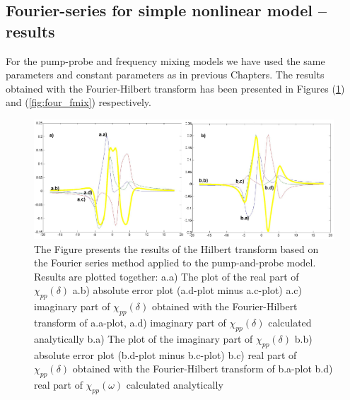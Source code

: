 \documentclass[12pt,twoside,a4paper]{article}
\numberwithin{equation}{subsection}
\numberwithin{figure}{subsection}
\begin{document}
\subsection{Fourier-series for simple nonlinear model -- results} \label{chap:fourier_nlo}

For the pump-probe and frequency mixing models we have used the same parameters and constant parameters as in previous Chapters. The results obtained with the Fourier-Hilbert transform has been presented in Figures (\ref{fig:four_pnp}) and (\ref{fig:four_fmix}) respectively.

\begin{figure} 
  \includegraphics[width=150mm]{img/four_pnp.png}
  \caption{The Figure presents the results of the Hilbert transform based on the Fourier series method applied to the pump-and-probe model. Results are plotted together:
     a.a) The plot of the real part of ${\chi_{pp}}(\delta )$
     a.b) absolute error plot (a.d-plot minus a.c-plot)
     a.c) imaginary part of ${\chi_{pp}}(\delta )$ obtained with the Fourier-Hilbert transform of a.a-plot, 
     a.d) imaginary part of ${\chi_{pp}}(\delta )$ calculated analytically 
     b.a) The plot of the imaginary part of ${\chi_{pp}}(\delta )$ 
     b.b) absolute error plot (b.d-plot minus b.c-plot)
     b.c) real part of ${\chi_{pp}}(\delta )$ obtained with the Fourier-Hilbert transform of b.a-plot 
     b.d) real part of $\chi_{pp} (\omega )$ calculated analytically 
     \label{fig:four_pnp}
     }
\end{figure} 
\end{document}
